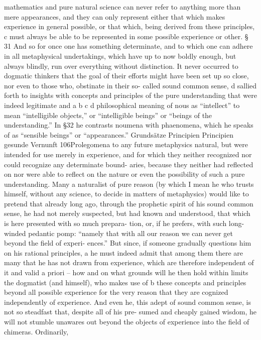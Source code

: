 mathematics and pure natural science can never refer to anything more
than mere appearances, and they can only represent either that which
makes experience in general possible, or that which, being derived from
these principles, c must always be able to be represented in some possible
experience or other.
§ 31
And so for once one has something determinate, and to which one can
adhere in all metaphysical undertakings, which have up to now boldly
enough, but always blindly, run over everything without distinction. It
never occurred to dogmatic thinkers that the goal of their efforts might
have been set up so close, nor even to those who, obstinate in their so-
called sound common sense, d sallied forth to insights with concepts and
principles of the pure understanding that were indeed legitimate and
a
b
c
d
philosophical meaning of nous as “intellect” to mean “intelligible objects,” or “intelligible
beings” or “beings of the understanding.” In §32 he contrasts noumena with phaenomena,
which he speaks of as “sensible beings” or “appearances.”
Grundsätze
Principien
Principien
gesunde Vernunft
106Prolegomena to any future metaphysics
natural, but were intended for use merely in experience, and for which
they neither recognized nor could recognize any determinate bound-
aries, because they neither had reﬂected on nor were able to reﬂect on
the nature or even the possibility of such a pure understanding.
Many a naturalist of pure reason (by which I mean he who trusts
himself, without any science, to decide in matters of metaphysics) would
like to pretend that already long ago, through the prophetic spirit of
his sound common sense, he had not merely suspected, but had known
and understood, that which is here presented with so much prepara-
tion, or, if he prefers, with such long-winded pedantic pomp: “namely
that with all our reason we can never get beyond the ﬁeld of experi-
ences.” But since, if someone gradually questions him on his rational
principles, a he must indeed admit that among them there are many that
he has not drawn from experience, which are therefore independent of
it and valid a priori – how and on what grounds will he then hold within
limits the dogmatist (and himself), who makes use of b these concepts
and principles beyond all possible experience for the very reason that
they are cognized independently of experience. And even he, this adept
of sound common sense, is not so steadfast that, despite all of his pre-
sumed and cheaply gained wisdom, he will not stumble unawares out
beyond the objects of experience into the ﬁeld of chimeras. Ordinarily,
